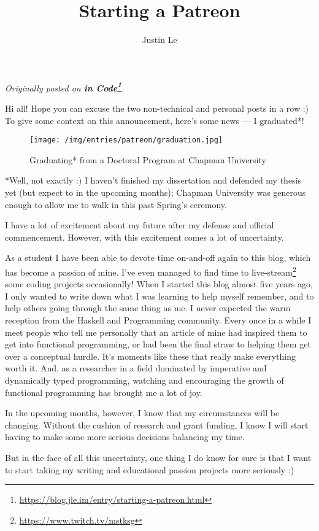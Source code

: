 \documentclass[]{article}
\title{Starting a Patreon}
\author{Justin Le}
\renewcommand{\href}[2]{#2\footnote{\url{#1}}}
\begin{document}
\maketitle

\emph{Originally posted on
\textbf{\href{https://blog.jle.im/entry/starting-a-patreon.html}{in Code}}.}

Hi all! Hope you can excuse the two non-technical and personal posts in a row :)
To give some context on this announcement, here's some news --- I graduated*!

\begin{figure}
\centering
\texttt{[image: /img/entries/patreon/graduation.jpg]}
\caption{Graduating* from a Doctoral Program at Chapman University}
\end{figure}

*Well, not exactly :) I haven't finished my dissertation and defended my thesis
yet (but expect to in the upcoming months); Chapman University was generous
enough to allow me to walk in this past Spring's ceremony.

I have a lot of excitement about my future after my defense and official
commencement. However, with this excitement comes a lot of uncertainty.

As a student I have been able to devote time on-and-off again to this blog,
which has become a passion of mine. I've even managed to find time to
\href{https://www.twitch.tv/mstksg}{live-stream} some coding projects
occasionally! When I started this blog almost five years ago, I only wanted to
write down what I was learning to help myself remember, and to help others going
through the same thing as me. I never expected the warm reception from the
Haskell and Programming community. Every once in a while I meet people who tell
me personally that an article of mine had inspired them to get into functional
programming, or had been the final straw to helping them get over a conceptual
hurdle. It's moments like these that really make everything worth it. And, as a
researcher in a field dominated by imperative and dynamically typed programming,
watching and encouraging the growth of functional programming has brought me a
lot of joy.

In the upcoming months, however, I know that my circumstances will be changing.
Without the cushion of research and grant funding, I know I will start having to
make some more serious decisions balancing my time.

But in the face of all this uncertainty, one thing I do know for sure is that I
want to start taking my writing and educational passion projects more seriously
:)
\end{document}
